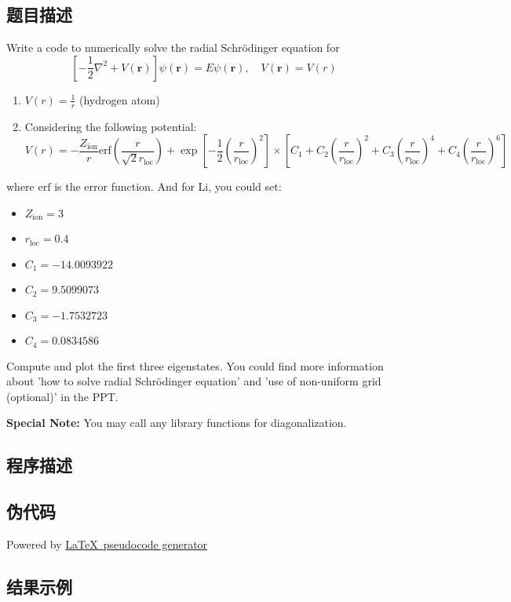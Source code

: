 \subsection{题目描述}
\noindent Write a code to numerically solve the radial Schrödinger equation for
\[
\left[-\frac{1}{2}\nabla^2+V(\mathbf{r})\right]\psi(\mathbf{r})=E\psi(\mathbf{r}), \quad V(\mathbf{r})=V(r)
\]
\begin{enumerate}
    \item \( V(r) = \frac{1}{r} \) (hydrogen atom)
    \item Considering the following potential:
    \[
    V(r) = -\frac{Z_{\text{ion}}}{r}\text{erf}\left(\frac{r}{\sqrt{2} r_{\text{loc}}}\right) 
    + \exp \left[ -\frac{1}{2} \left(\frac{r}{r_{\text{loc}}}\right)^{2}\right]
    \times \left[C_1 + C_2\left(\frac{r}{r_{\text{loc}}}\right)^2+C_3\left(\frac{r}{r_{\text{loc}}}\right)^4+C_4\left(\frac{r}{r_{\text{loc}}}\right)^6\right]
    \]
\end{enumerate}
where \(\text{erf}\) is the error function. And for Li, you could set:
\begin{itemize}
    \item \( Z_{\text{ion}}=3 \)
    \item \( r_{\text{loc}}=0.4 \)
    \item \( C_1=-14.0093922 \)
    \item \( C_2=9.5099073 \)
    \item \( C_3=-1.7532723 \)
    \item \( C_4=0.0834586 \)
\end{itemize}
\noindent Compute and plot the first three eigenstates. You could find more information about 'how to solve radial Schrödinger equation' and 'use of non-uniform grid (optional)' in the PPT.

\textbf{Special Note:} You may call any library functions for diagonalization.


\subsection{程序描述}

\subsection{伪代码}
Powered by \href{https://chatgpt.com/g/g-xJJAA2awf-latex-pseudocode-generator}{\LaTeX \ pseudocode generator}

\subsection{结果示例}

